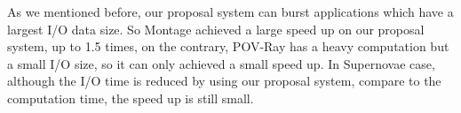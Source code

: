  As we mentioned before, our proposal system can burst applications which have a largest I/O data
 size.
 So Montage achieved a large speed up on our proposal system, up to 1.5 times, on the contrary,
 POV-Ray has a heavy computation but a small I/O size, so it can only achieved a small speed up.
 In Supernovae case, although the I/O time is reduced by using our proposal system, compare to the
 computation time, the speed up is still small.
% 
% 
% 



